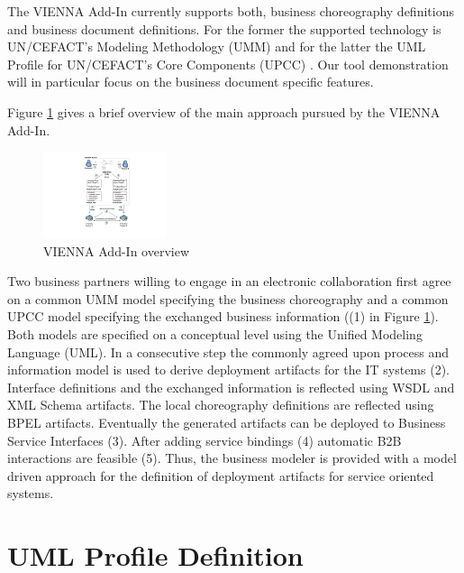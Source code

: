 \documentclass{acm_proc_article-sp}
\begin{document}
The VIENNA Add-In currently supports both, business choreography definitions and business document definitions. For the former the supported technology is UN/CEFACT's Modeling Methodology (UMM) \cite{man:umm2} and for the latter the UML Profile for UN/CEFACT's Core Components (UPCC) \cite{man:upcc}. Our tool demonstration will in particular focus on the business document specific features. 

Figure \ref{fig:viennaaddinoverview} gives a brief overview of the main approach pursued by the VIENNA Add-In. 
\begin{figure}
 \centering
   \includegraphics[width=0.32\textwidth]{figures/addinoverview.pdf}
 \caption{VIENNA Add-In overview}
 \label{fig:viennaaddinoverview}
\end{figure}
Two business partners willing to engage in an electronic collaboration first agree on a common UMM model specifying the business choreography and a common UPCC model specifying the exchanged business information ((1) in Figure \ref{fig:viennaaddinoverview}). Both models are specified on a conceptual level using the Unified Modeling Language (UML). In a consecutive step the commonly agreed upon process and information model is used to derive deployment artifacts for the IT systems (2). Interface definitions and the exchanged information is reflected using WSDL and XML Schema artifacts. The local choreography definitions are reflected using BPEL artifacts. Eventually the generated artifacts can be deployed to Business Service Interfaces (3). After adding service bindings (4) automatic B2B interactions are feasible (5). Thus, the business modeler is provided with a model driven approach for the definition of deployment artifacts for service oriented systems.


\section{UML Profile Definition}
\end{document}
